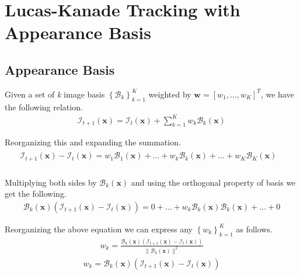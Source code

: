 \documentclass[a4paper]{article}
\begin{document}
\section{Lucas-Kanade Tracking with Appearance Basis}
\subsection{Appearance Basis}
Given a set of \textit{k} image basis $\left\{ \mathcal { B } _ { k } \right\} _ { k = 1 } ^ { K }$ weighted by $\mathbf { w } = \left[ w _ { 1 } , \dots , w _ { K } \right] ^ { T }$, we have the following relation.
\begin{gather}
\mathcal { I } _ { t + 1 } ( \mathbf { x } ) = \mathcal { I } _ { t } ( \mathbf { x } ) + \sum _ { k = 1 } ^ { K } w _ { k } \mathcal { B } _ { k } ( \mathbf { x } )
\end{gather}

Reorganizing this and expanding the summation.
\begin{gather}
\begin{array}{c}
\mathcal { I } _ { t + 1 } ( \mathbf { x } ) - \mathcal { I } _ { t } ( \mathbf { x } ) = w _ { 1 } \mathcal { B } _ { 1 } ( \mathbf { x } ) + \dots + w _ { k } \mathcal { B } _ { k } ( \mathbf { x } ) + \dots + w _ { K } \mathcal { B } _ { K } ( \mathbf { x } )
&  \\
\end{array}    
\end{gather}

Multiplying both sides by $\mathcal { B } _ { k } ( \mathbf { x } )$ and using the orthogonal property of basis we get the following.
\begin{gather}
    \mathcal { B } _ { k } ( \mathbf { x } )(\mathcal { I } _ { t + 1 } ( \mathbf { x } ) - \mathcal { I } _ { t } ( \mathbf { x } )) = 0 + \dots + w _ { k } \mathcal { B } _ { k } ( \mathbf { x } ) \mathcal { B } _ { k } ( \mathbf { x } ) + \dots + 0
\end{gather}

Reorganizing the above equation we can express any $\left\{ w _ { k } \right\} _ { k = 1 } ^ { K }$ as follows.
\begin{gather}
w _ { k } = \frac{\mathcal { B } _ { k } ( \mathbf { x } ) (\mathcal { I } _ { t + 1 } ( \mathbf { x } ) - \mathcal { I } _ { t } ( \mathbf { x } ))}{\| \mathcal { B } _ { k } ( \mathbf { x } ) \| ^ { 2 }}
\end{gather}
\begin{gather}
    w _ { k } = \mathcal { B } _ { k } ( \mathbf { x } ) (\mathcal { I } _ { t + 1 } ( \mathbf { x } ) - \mathcal { I } _ { t } ( \mathbf { x } ))
\end{gather}
\end{document}
